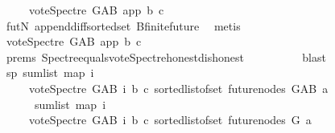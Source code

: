 \begin{isabellebody}
\ \ \ \ {\isacharminus}{\kern0pt}\ {\isacharparenleft}{\kern0pt}vote{\isacharunderscore}{\kern0pt}Spectre\ G{\isacharunderscore}{\kern0pt}AB\ app\ b\ c{\isacharparenright}{\kern0pt}{\isachardoublequoteclose}\isanewline
\ \ \ \ \ \ \ \ \isamarkupfalse%
\ futN\ append{\isacharunderscore}{\kern0pt}diff{\isacharunderscore}{\kern0pt}sorted{\isacharunderscore}{\kern0pt}set\ B{}{\isachardot}{\kern0pt}finite{\isacharunderscore}{\kern0pt}future\ \isamarkupfalse%
\ metis\isanewline
\ \ \ \ \ \ \isamarkupfalse%
\ {\isachardoublequoteopen}vote{\isacharunderscore}{\kern0pt}Spectre\ G{\isacharunderscore}{\kern0pt}AB\ app\ b\ c\ {\isacharequal}{\kern0pt}\ {}{\isachardoublequoteclose}\isanewline
\ \ \ \ \ \ \ \ \isamarkupfalse%
\ {\isachardoublequoteopen}{}{\isachardot}{\kern0pt}prems{\isachardoublequoteclose}\ Spectre{\isacharunderscore}{\kern0pt}equals{\isacharunderscore}{\kern0pt}vote{\isacharunderscore}{\kern0pt}Spectre{\isacharunderscore}{\kern0pt}honest{\isacharunderscore}{\kern0pt}dishonest\isanewline
\ \ \ \ \ \ \ \ \isamarkupfalse%
\ blast\ \isanewline
\ \ \ \ \ \ \isamarkupfalse%
\ \isamarkupfalse%
\ sp{}{\isacharcolon}{\kern0pt}\ {\isachardoublequoteopen}sum{\isacharunderscore}{\kern0pt}list\ {\isacharparenleft}{\kern0pt}map\ {\isacharparenleft}{\kern0pt}{\isasymlambda}i{\isachardot}{\kern0pt}\isanewline
\ \ \ \ \ {\isacharparenleft}{\kern0pt}vote{\isacharunderscore}{\kern0pt}Spectre\ G{\isacharunderscore}{\kern0pt}AB\ i\ b\ c{\isacharparenright}{\kern0pt}{\isacharparenright}{\kern0pt}\ {\isacharparenleft}{\kern0pt}sorted{\isacharunderscore}{\kern0pt}list{\isacharunderscore}{\kern0pt}of{\isacharunderscore}{\kern0pt}set\ {\isacharparenleft}{\kern0pt}future{\isacharunderscore}{\kern0pt}nodes\ G{\isacharunderscore}{\kern0pt}AB\ a{\isacharparenright}{\kern0pt}{\isacharparenright}{\kern0pt}{\isacharparenright}{\kern0pt}\ {\isacharequal}{\kern0pt}\ \isanewline
\ \ \ \ \ \ sum{\isacharunderscore}{\kern0pt}list\ {\isacharparenleft}{\kern0pt}map\ {\isacharparenleft}{\kern0pt}{\isasymlambda}i{\isachardot}{\kern0pt}\isanewline
\ \ \ \ \ {\isacharparenleft}{\kern0pt}vote{\isacharunderscore}{\kern0pt}Spectre\ G{\isacharunderscore}{\kern0pt}AB\ i\ b\ c{\isacharparenright}{\kern0pt}{\isacharparenright}{\kern0pt}\ {\isacharparenleft}{\kern0pt}sorted{\isacharunderscore}{\kern0pt}list{\isacharunderscore}{\kern0pt}of{\isacharunderscore}{\kern0pt}set\ {\isacharparenleft}{\kern0pt}future{\isacharunderscore}{\kern0pt}nodes\ G\ a{\isacharparenright}{\kern0pt}{\isacharparenright}{\kern0pt}{\isacharparenright}{\kern0pt}\ {\isacharplus}{\kern0pt}\ {}{\isachardoublequoteclose}\ \isanewline

\end{isabellebody}
